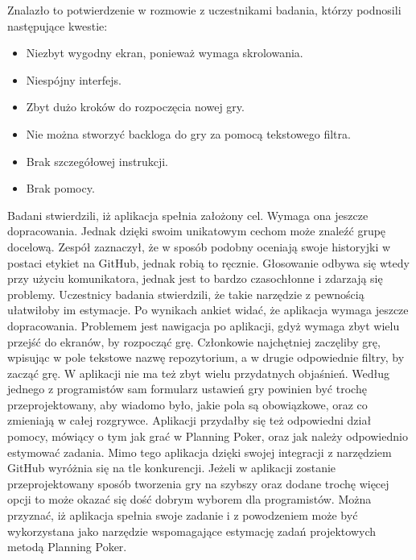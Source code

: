 Znalazło to potwierdzenie w rozmowie z uczestnikami badania, którzy podnosili następujące kwestie:
\begin{itemize}
    \item Niezbyt wygodny ekran, ponieważ wymaga skrolowania.
    \item Niespójny interfejs.
    \item Zbyt dużo kroków do rozpoczęcia nowej gry.
    \item Nie można stworzyć backloga do gry za pomocą tekstowego filtra.
    \item Brak szczegółowej instrukcji.
    \item Brak pomocy.
\end{itemize}
Badani stwierdzili, iż aplikacja spełnia założony cel. Wymaga ona jeszcze dopracowania. Jednak dzięki
swoim unikatowym cechom może znaleźć grupę docelową.
Zespół zaznaczył, że w sposób podobny oceniają swoje historyjki w postaci etykiet na GitHub, jednak
robią to ręcznie. Głosowanie odbywa się wtedy przy użyciu komunikatora, jednak jest to bardzo czasochłonne i
zdarzają się problemy. Uczestnicy badania stwierdzili, że takie narzędzie z pewnością ułatwiłoby im estymacje.
Po wynikach ankiet widać, że aplikacja wymaga jeszcze dopracowania. Problemem jest nawigacja po
aplikacji, gdyż wymaga zbyt wielu przejść do ekranów, by rozpocząć grę. Członkowie najchętniej zaczęliby grę,
wpisując w pole tekstowe nazwę repozytorium, a w drugie odpowiednie filtry, by zacząć grę. W aplikacji nie ma
też zbyt wielu przydatnych objaśnień. Według jednego z programistów sam formularz ustawień gry powinien
być trochę przeprojektowany, aby wiadomo było, jakie pola są obowiązkowe, oraz co zmieniają w całej
rozgrywce.
Aplikacji przydałby się też odpowiedni dział pomocy, mówiący o tym jak grać w Planning Poker, oraz jak
należy odpowiednio estymować zadania. Mimo tego aplikacja dzięki swojej integracji z narzędziem GitHub
wyróżnia się na tle konkurencji. Jeżeli w aplikacji zostanie przeprojektowany sposób tworzenia gry na szybszy
oraz dodane trochę więcej opcji to może okazać się dość dobrym wyborem dla programistów.
Można przyznać, iż aplikacja spełnia swoje zadanie i z powodzeniem może być wykorzystana jako
narzędzie wspomagające estymację zadań projektowych metodą Planning Poker.
